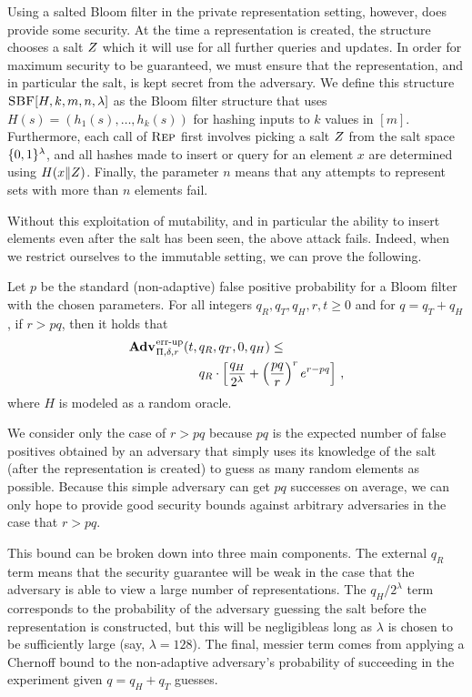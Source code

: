 {Using a salted Bloom filter in the private representation setting, however, does
provide some security. At the time a representation is created, the structure
chooses a salt $Z$ which it will use for all further queries and updates. In
order for maximum security to be guaranteed, we must ensure that the
representation, and in particular the salt, is kept secret from the adversary.
We define this structure $\textnormal{\textsc{SBF}}[H,k,m,n,\lambda]$ as the Bloom filter structure
that uses $H(s) = (h_1(s),\ldots,h_k(s))$ for hashing inputs to $k$ values in
$[m]$. Furthermore, each call of $\textnormal{\textsc{Rep}}$ first involves picking a salt $Z$
from the salt space $\{0,1\}^\lambda$, and all hashes made to insert or query for
an element $x$ are determined using $H(x \Vert Z)$. Finally, the parameter
$n$ means that any attempts to represent sets with more than $n$ elements fail.
}

Without this exploitation of mutability, and in particular the ability to insert
elements even after the salt has been seen, the above attack fails. Indeed, when
we restrict ourselves to the immutable setting, we can prove the following.
%
\begin{theorem}\label{thm:sbf-errep-immutable}
Let $p$ be the standard (non-adaptive) false positive probability for a Bloom
filter with the chosen parameters. For all integers $q_R, q_T, q_H, r, t \geq 0$
and for $q = q_T + q_H$, if $r > pq$, then it holds that
  \begin{equation*}
    \begin{aligned}
            \Adv{\errep}_{\Pi,\delta,r}(t,\,&q_R,q_T,0,q_H) \leq \\
        & q_R \cdot \left[\frac{q_H}{2^\lambda} +
        \left(\frac{pq}{r}\right)^re^{r-pq}\right] \,,
    \end{aligned}
  \end{equation*}
  where $H$ is modeled as a random oracle.  %
\end{theorem}
We consider only the case of $r > pq$ because $pq$ is the expected number of
false positives obtained by an adversary that simply uses its knowledge of the
salt (after the representation is created) to guess as many random elements as
possible. Because this simple adversary can get $pq$ successes on average, we
can only hope to provide good security bounds against arbitrary adversaries in
the case that $r > pq$.

This bound can be broken down into three main components. The external $q_R$
term means that the security guarantee will be weak in the case that the
adversary is able to view a large number of representations. The $q_H/2^\lambda$
term corresponds to the probability of the adversary guessing the salt before
the representation is constructed, but this will be negligibleas long as
$\lambda$ is chosen to be sufficiently large (say, $\lambda=128$). The final,
messier term comes from applying a Chernoff bound to the non-adaptive
adversary's probability of succeeding in the experiment given $q = q_H+q_T$
guesses.

